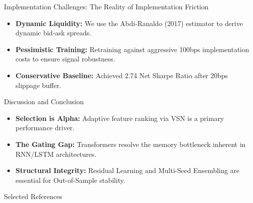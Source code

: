 \begin{frame}{Implementation Challenges: The Reality of Implementation Friction}
    \begin{itemize}
        \item \textbf{Dynamic Liquidity:} We use the Abdi-Ranaldo (2017) estimator to derive dynamic bid-ask spreads.
        \item \textbf{Pessimistic Training:} Retraining against aggressive 100bps implementation costs to ensure signal robustness.
        \item \textbf{Conservative Baseline:} Achieved 2.74 Net Sharpe Ratio after 20bps slippage buffer.
    \end{itemize}
\end{frame}

\begin{frame}{Discussion and Conclusion}
    \begin{itemize}
        \item \textbf{Selection is Alpha:} Adaptive feature ranking via VSN is a primary performance driver.
        \item \textbf{The Gating Gap:} Transformers resolve the memory bottleneck inherent in RNN/LSTM architectures.
        \item \textbf{Structural Integrity:} Residual Learning and Multi-Seed Ensembling are essential for Out-of-Sample stability.
    \end{itemize}
\end{frame}

\begin{frame}[allowframebreaks]{Selected References}
    \printbibliography
\end{frame}
